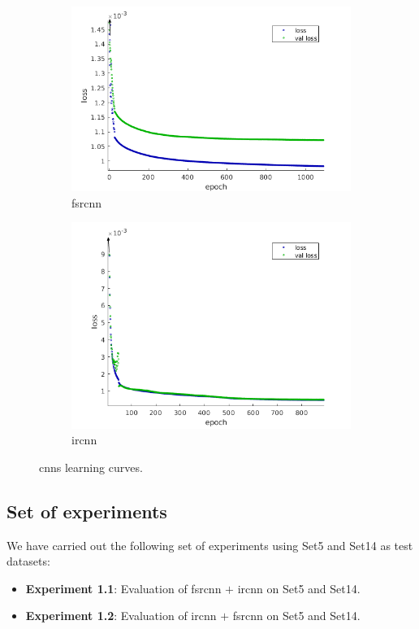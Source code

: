 \begin{figure}[h]
	\centering
	\begin{subfigure}{0.4\textwidth}
		\includegraphics[width=\textwidth]{images/fsrcnn_train.png}
		\caption{\gls{fsrcnn}}
	\end{subfigure}
	\begin{subfigure}{0.4\textwidth}
		\includegraphics[width=\textwidth]{images/ircnn_train.png}
		\caption{\gls{ircnn}}
	\end{subfigure}
	\caption{\glspl{cnn} learning curves.}
	\label{fig:training}
\end{figure}

\subsection{Set of experiments}
We have carried out the following set of experiments using Set5 \cite{SET5} and Set14 \cite{SET14} as test datasets:
\begin{itemize}
	\item \textbf{Experiment 1.1}: Evaluation of \gls{fsrcnn} $+$ \gls{ircnn} on Set5 and Set14.
	\item \textbf{Experiment 1.2}: Evaluation of \gls{ircnn} $+$ \gls{fsrcnn} on Set5 and Set14.
\end{itemize}

